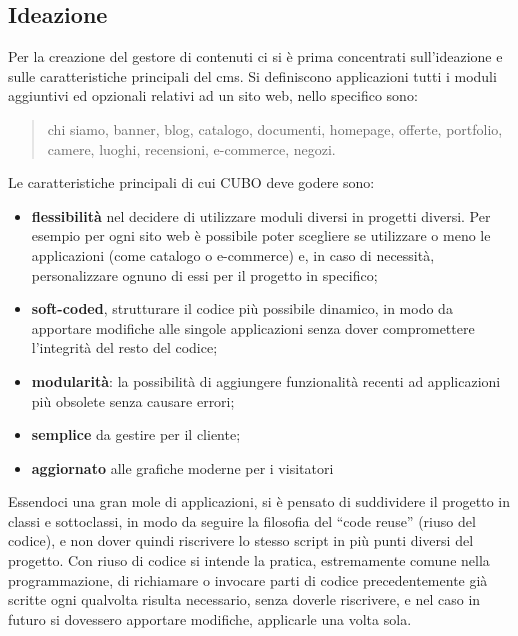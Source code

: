 \documentclass[12pt,a4paper]{article}
\begin{document}
\subsection{Ideazione}
Per la creazione del gestore di contenuti ci si è prima concentrati sull’ideazione e sulle caratteristiche principali del cms.
Si definiscono applicazioni tutti i moduli aggiuntivi ed opzionali relativi ad un sito web, nello specifico sono:
\begin{quote}
    chi siamo, banner, blog, catalogo, documenti, homepage, offerte, portfolio, camere, luoghi, recensioni, e-commerce, negozi.
\end{quote}
Le caratteristiche principali di cui CUBO deve godere sono:
\begin{itemize}
    \item \textbf{flessibilità} nel decidere di utilizzare moduli diversi in progetti diversi. Per esempio per ogni sito web è possibile poter scegliere se utilizzare o meno le applicazioni (come catalogo o e-commerce) e, in caso di necessità, personalizzare ognuno di essi per il progetto in specifico;
    \item \textbf{soft-coded}, strutturare il codice più possibile dinamico, in modo da apportare modifiche alle singole applicazioni senza dover compromettere l’integrità del resto del codice;
    \item \textbf{modularità}: la possibilità di aggiungere funzionalità recenti ad applicazioni più obsolete senza causare errori;
    \item \textbf{semplice} da gestire per il cliente;
    \item \textbf{aggiornato} alle grafiche moderne per i visitatori
\end{itemize}
Essendoci una gran mole di applicazioni, si è pensato di suddividere il progetto in classi e sottoclassi, in modo da seguire la filosofia del “code reuse” (riuso del codice), e non dover quindi riscrivere lo stesso script in più punti diversi del progetto.
Con riuso di codice si intende la pratica, estremamente comune nella programmazione, di richiamare o invocare parti di codice precedentemente già scritte ogni qualvolta risulta necessario, senza doverle riscrivere, e nel caso in futuro si dovessero apportare modifiche, applicarle una volta sola.
\end{document}
